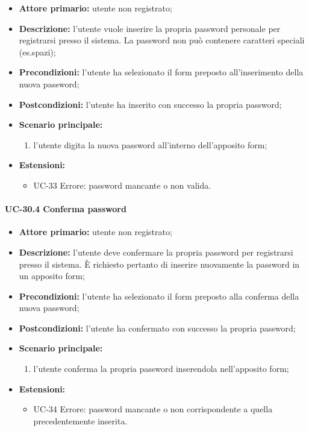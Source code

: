 	\begin{itemize}
		\item \textbf{Attore primario:} utente non registrato;

		\item \textbf{Descrizione:} l'utente vuole inserire la propria password personale per registrarsi presso il sistema. La password non può contenere caratteri speciali (es.spazi);

		\item \textbf{Precondizioni:} l'utente ha selezionato il form preposto all'inserimento della nuova password;

		\item \textbf{Postcondizioni:} l'utente ha inserito con successo la propria password;

		\item \textbf{Scenario principale:}
			\begin{enumerate}
		  		\item l'utente digita la nuova password all'interno dell'apposito form;
	  		\end{enumerate}
		\item \textbf{Estensioni:}
	  		\begin{itemize}
		  		\item UC-33 Errore: password mancante o non valida.
	  		\end{itemize}
	\end{itemize}

\paragraph{UC-30.4 Conferma password}

	\begin{itemize}
		\item \textbf{Attore primario:} utente non registrato;
	
		\item \textbf{Descrizione:} l'utente deve confermare la propria password per registrarsi presso il sistema. \`{E} richiesto pertanto di inserire nuovamente la password in un apposito form;

		\item \textbf{Precondizioni:} l'utente ha selezionato il form preposto alla conferma della nuova password;

		\item \textbf{Postcondizioni:} l'utente ha confermato con successo la propria password;

		\item \textbf{Scenario principale:}
			\begin{enumerate}
		  		\item l'utente conferma la propria password inserendola nell'apposito form;
	  		\end{enumerate}
		\item \textbf{Estensioni:}
	  		\begin{itemize}
		  		\item UC-34 Errore: password mancante o non corrispondente a quella precedentemente inserita.
	  		\end{itemize}
	\end{itemize}

